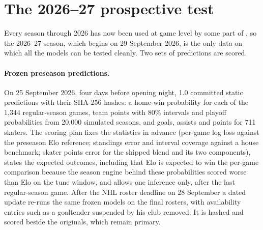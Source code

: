 \section{The 2026--27 prospective test}
\label{sec:live}

Every season through 2026 has now been used at game level by some part of
\neurhl{}, so the 2026--27 season, which begins on 29 September 2026, is the
only data on which all the models can be tested cleanly. Two sets of
predictions are scored.

\paragraph{Frozen preseason predictions.}
On 25 September 2026, four days before opening night, \neurhl{} 1.0 committed
static predictions with their SHA-256 hashes: a home-win probability for each
of the 1,344 regular-season games, team points with 80\% intervals and
playoff probabilities from 20,000 simulated seasons, and goals, assists and
points for 711 skaters. The scoring plan fixes the statistics in advance (per-game
log loss against the preseason Elo reference; standings error and interval
coverage against a house benchmark; skater points error for the shipped blend
and its two components), states the expected outcomes, including that Elo is
expected to win the per-game comparison because the season engine behind these
probabilities scored worse than Elo on the tune window, and allows one
inference only, after the last regular-season game. After the NHL roster
deadline on 28 September a dated update re-runs the same frozen models on the
final rosters, with availability entries such as a goaltender suspended by his
club removed. It is hashed and scored beside the originals, which remain
primary.

